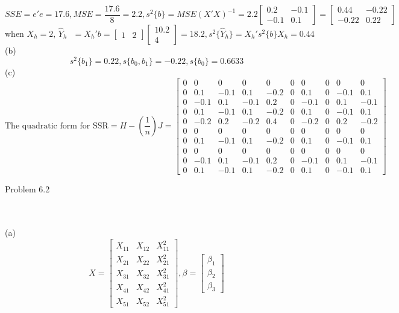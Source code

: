 \documentclass{article}
\begin{document}
\[SSE=e'e=17.6,MSE=\frac{17.6}{8}=2.2,s^2\{b\}=MSE(X'X)^{-1}=2.2\begin{bmatrix}0.2&-0.1\\-0.1&0.1\end{bmatrix}=\begin{bmatrix}0.44&-0.22\\-0.22&0.22\end{bmatrix}\]
\[\text{when $X_h=2$, $\hat{Y}_h$ }=X_h'b=\begin{bmatrix}1&2\end{bmatrix}\begin{bmatrix}10.2\\4\end{bmatrix}=18.2,s^2\{\hat{Y}_h\}=X_h's^2\{b\}X_h=0.44\]
(b)\[s^2\{b_1\}=0.22,s\{b_0,b_1\}=-0.22,s\{b_0\}=0.6633\]
(c)\[\text{The quadratic form for SSR}=H-\left(\frac{1}{n}\right)J=\begin{bmatrix}0 & 0 & 0 & 0 & 0 & 0 & 0 & 0 & 0 & 0\\ 0 & 0.1 & -0.1 & 0.1 & -0.2 & 0 & 0.1 & 0 & -0.1 & 0.1\\ 0 & -0.1 & 0.1 & -0.1 & 0.2 & 0 & -0.1 & 0 & 0.1 & -0.1\\ 0 & 0.1 & -0.1 & 0.1 & -0.2 & 0 & 0.1 & 0 & -0.1 & 0.1\\ 0 & -0.2 & 0.2 & -0.2 & 0.4 & 0 & -0.2 & 0 & 0.2 & -0.2\\ 0 & 0 & 0 & 0 & 0 & 0 & 0 & 0 & 0 & 0\\ 0 & 0.1 & -0.1 & 0.1 & -0.2 & 0 & 0.1 & 0 & -0.1 & 0.1\\ 0 & 0 & 0 & 0 & 0 & 0 & 0 & 0 & 0 & 0\\ 0 & -0.1 & 0.1 & -0.1 & 0.2 & 0 & -0.1 & 0 & 0.1 & -0.1\\ 0 & 0.1 & -0.1 & 0.1 & -0.2 & 0 & 0.1 & 0 & -0.1 & 0.1\end{bmatrix}
\]
\begin{large}Problem 6.2\end{large}
\\\\(a)\[X=\begin{bmatrix}X_{11}&X_{12}&X_{11}^2\\X_{21}&X_{22}&X_{21}^2\\X_{31}&X_{32}&X_{31}^2\\X_{41}&X_{42}&X_{41}^2\\X_{51}&X_{52}&X_{51}^2\end{bmatrix},\beta=\begin{bmatrix}\beta_1\\\beta_2\\\beta_3\end{bmatrix}\]
\end{document}
